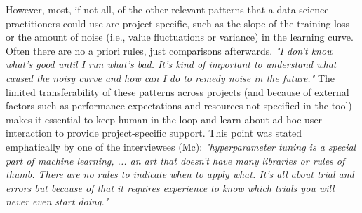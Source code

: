 \documentclass[preprint]{vgtc}        %
\begin{document}
However, most, if not all, of the other relevant patterns that a data science practitioners could use are project-specific, 
such as the slope of the training loss or the amount of noise (i.e., value fluctuations or variance) in the learning curve. 
Often there are no a priori rules, just comparisons afterwards. \textit{"I don't know what's good until I run what's bad. It's kind of important to understand what caused the noisy curve and how can I do to remedy noise in the future."} 
% 
% 
The limited transferability of these patterns across projects (and because of external factors such as performance expectations and resources not specified in the tool) makes it essential to keep human in the loop and learn about ad-hoc user interaction to provide project-specific support.
This point was stated emphatically by one of the interviewees (Mc): \textit{"hyperparameter tuning is a special part of machine learning, ... an art that doesn't have many libraries or rules of thumb. There are no rules to indicate when to apply what. It's all about trial and errors but because of that it requires experience to know which trials you will never even start doing."} 
 
\end{document}
